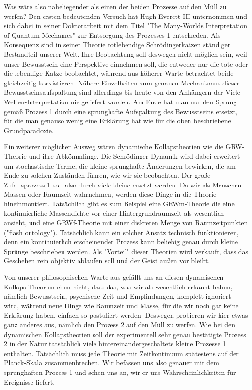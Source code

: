 \documentclass[12pt]{book}
\begin{document}
Was wäre also naheliegender als einen der beiden Prozesse auf den Müll zu werfen? Den ersten bedeutenden Versuch hat Hugh Everett III unternommen und sich dabei in seiner Doktorarbeit mit dem Titel "The Many-Worlds Interpretation
of Quantum Mechanics" zur Entsorgung des Prozesses 1 entschieden. Als Konsequenz sind in seiner Theorie totlebendige Schrödingerkatzen ständiger Bestandteil unserer Welt. Ihre Beobachtung soll deswegen nicht möglich sein, weil unser Bewusstsein eine Perspektive einnehmen soll, die entweder nur die tote oder die lebendige Katze beobachtet, während aus höherer Warte betrachtet beide gleichzeitig koexistieren. Nähere Einzelheiten zum genauen Mechanismus dieser Bewusstseinsaufspaltung sind allerdings bis heute von den Anhängern der Viele-Welten-Interpretation nie geliefert worden. Am Ende hat man nur den Sprung gemäß Prozess 1 durch eine sprunghafte Aufspaltung des Bewusstseins ersetzt, für die man genauso wenig eine Erklärung hat wie für die oben beschriebene Grundparadoxie.

Ein weiterer möglicher Ausweg wären dynamische Kollapstheorien wie die GRW-Theorie und ihre Abkömmlinge. Die Schrödinger-Dynamik wird dabei erweitert um stochastische Terme, die kleine sprunghafte Änderungen bewirken, die am Ende zu solchen Zuständen führen, wie wir sie beobachten. Der große Zufallsprozess 1 soll also durch viele kleine ersetzt werden. Da wir als Menschen Massen oder Raumzeit wahrnehmen, werden diese Dinge in die Theorie hineinmontiert. Tatsächlich gibt es zum Beispiel eine GRWm-Theorie die eine kontinuierliche Massendichte vor einer Hintergrundraumzeit als wesentlich ansieht, und eine GRWf-Theorie mit einer diskreten Menge von Raumzeitpunkten ("flash ontology"). Tatsächlich kann ein solcher Ansatz technisch funktionieren, denn ein kontinuierlich erscheinender Prozess kann beliebig genau durch kleine Sprünge beschrieben werden. Als "Vorteil" dieser Theorien wird verkauft, dass das Geschehen rein objektiv ablaufen soll und der Geist außen vor bleibt. 

Von unserer philosophischen Warte aus gefällt uns an diesen dynamischen Kollaps-Theorien eben nicht, dass das, was wir als wesentlich erkannt haben, nämlich Bewusstsein, psychische Zeit und Empfindungen, komplett ignoriert wird, während neue Dinge wie Raumzeit und Masse, für die wir noch gar keine Erklärung haben, einfach so postuliert werden. Deswegen probieren wir hier etwas ganz anderes aus, nämlich den Prozess 2 auf den Müll zu werfen. Wie bei den dynamischen Kollapstheorien soll der experimentell sehr genau bestätigte Prozess 2 in der Natur tatsächlich viele hintereinandergeschaltete kleine Prozesse 1 enthalten. Tatsächlich muss jede Theorie mit Zeitkontinuum spätestens auf der Planck-Skala zusammenbrechen. Wir befassen uns also genauer mit dem sprunghaften Prozess 1 und sehen uns an, wir er uns Wahrscheinlichkeiten für Ereignisse liefert.
\end{document}
